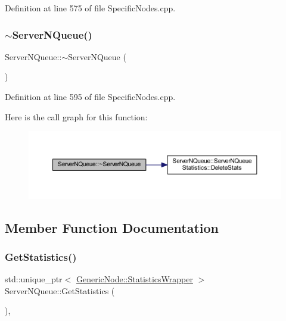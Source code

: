 Definition at line 575 of file Specific\+Nodes.\+cpp.

\mbox{\label{class_server_n_queue_ab13c0aee5829a612bf6bda12c82ad6b7}} 
\subsubsection{\texorpdfstring{$\sim$\+Server\+N\+Queue()}{~ServerNQueue()}}
{\footnotesize\ttfamily Server\+N\+Queue\+::$\sim$\+Server\+N\+Queue (\begin{DoxyParamCaption}{ }\end{DoxyParamCaption})}



Definition at line 595 of file Specific\+Nodes.\+cpp.

Here is the call graph for this function\+:
\nopagebreak
\begin{figure}[H]
\begin{center}
\leavevmode
\includegraphics[width=350pt]{class_server_n_queue_ab13c0aee5829a612bf6bda12c82ad6b7_cgraph}
\end{center}
\end{figure}


\subsection{Member Function Documentation}
\mbox{\label{class_server_n_queue_a18718f3796f33fa0f9d9100c34a6a7dc}} 
\subsubsection{\texorpdfstring{Get\+Statistics()}{GetStatistics()}}
{\footnotesize\ttfamily std\+::unique\+\_\+ptr$<$ \hyperlink{class_generic_node_1_1_statistics_wrapper}{Generic\+Node\+::\+Statistics\+Wrapper} $>$ Server\+N\+Queue\+::\+Get\+Statistics (\begin{DoxyParamCaption}{ }\end{DoxyParamCaption})\hspace{0.3cm}{\ttfamily [override]}, {\ttfamily [virtual]}}



